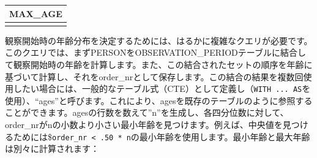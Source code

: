 \documentclass[
  11pt]{book}
\theoremstyle{definition}
\theoremstyle{definition}
\theoremstyle{definition}
\theoremstyle{definition}
\theoremstyle{remark}
\begin{document}
\begin{longtable}[]{@{}r@{}}
\toprule\noalign{}
MAX\_AGE \\
\midrule\noalign{}
\endhead
\bottomrule\noalign{}
\endlastfoot
90 \\
\end{longtable}

観察開始時の年齢分布を決定するためには、はるかに複雑なクエリが必要です。このクエリでは、まずPERSONをOBSERVATION\_PERIODテーブルに結合して観察開始時の年齢を計算します。また、この結合されたセットの順序を年齢に基づいて計算し、それをorder\_nrとして保存します。この結合の結果を複数回使用したい場合には、一般的なテーブル式（CTE）として定義し（\texttt{WITH\ ...\ AS}を使用）、``ages''と呼びます。これにより、agesを既存のテーブルのように参照することができます。agesの行数を数えて''n''を生成し、各四分位数に対して、order\_nrがnの小数より小さい最小年齢を見つけます。例えば、中央値を見つけるためには\$\texttt{order\_nr\ \textless{}\ .50\ *\ n}の最小年齢を使用します。最小年齢と最大年齢は別々に計算されます：
\end{document}
